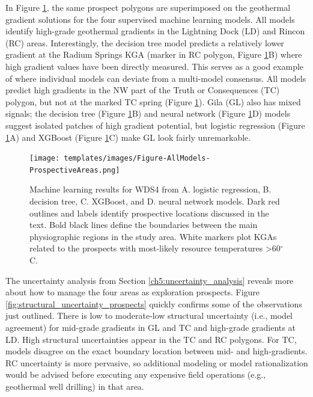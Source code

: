In Figure \ref{fig:ml_models_prospects}, the same prospect polygons are superimposed on the geothermal gradient solutions for the four supervised machine learning models. All models identify high-grade geothermal gradients in the Lightning Dock (LD) and Rincon (RC) areas. Interestingly, the decision tree model predicts a relatively lower gradient at the Radium Springs KGA (marker in RC polygon, Figure \ref{fig:ml_models_prospects}B) where high gradient values have been  directly measured. This serves as a good example of where individual models can deviate from a multi-model consensus. All models predict high gradients in the NW part of the Truth or Consequences (TC) polygon, but not at the marked TC spring (Figure \ref{fig:ml_models_prospects}). Gila (GL) also has mixed signals; the decision tree (Figure \ref{fig:ml_models_prospects}B) and neural network (Figure \ref{fig:ml_models_prospects}D) models suggest isolated patches of high gradient potential, but logistic regression (Figure \ref{fig:ml_models_prospects}A) and XGBoost (Figure \ref{fig:ml_models_prospects}C) make GL look fairly unremarkable.

\begin{figure}
\centering
\texttt{[image: templates/images/Figure-AllModels-ProspectiveAreas.png]}
\caption[Machine learning models with prospective areas]
{Machine learning results for WDS4 from A. logistic regression, B. decision tree, C. XGBoost, and D. neural network models. Dark red outlines and labels identify prospective locations discussed in the text. Bold black lines define the boundaries between the main physiographic regions in the study area. White markers plot KGAs related to the prospects with most-likely resource temperatures >60$^\circ$C.}
\label{fig:ml_models_prospects}
\end{figure}

The uncertainty analysis from Section \ref{ch5:uncertainty_analysis} reveals more about how to manage the four areas as exploration prospects. Figure \ref{fig:structural_uncertainty_prospects} quickly confirms some of the observations just outlined. There is low to moderate-low structural uncertainty (i.e., model agreement) for mid-grade gradients in GL and TC and high-grade gradients at LD. High structural uncertainties appear in the TC and RC polygons. For TC, models disagree on the exact boundary location between mid- and high-gradients. RC uncertainty is more pervasive, so additional modeling or model rationalization would be advised before executing any expensive field operations (e.g., geothermal well drilling) in that area.

